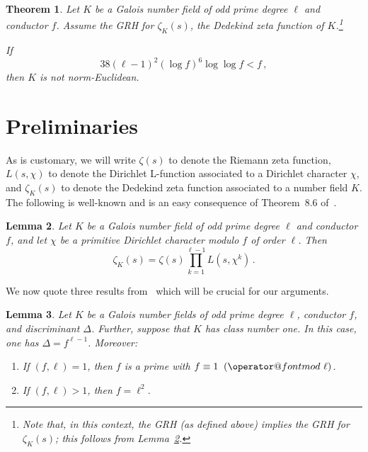 \documentclass{amsart}
\newtheorem{theorem}{Theorem}[section]
\newtheorem{lemma}[theorem]{Lemma}
\numberwithin{equation}{section}
\numberwithin{table}{section}
\begin{document}
\begin{theorem}\label{T:GRH}
 Let $K$ be a Galois number field of odd prime degree $\ell$ and conductor $f$.
 Assume the GRH for $\zeta_K(s)$, the Dedekind zeta function of $K$.\footnote{Note that, in this context, the GRH (as defined above) implies the GRH for $\zeta_K(s)$;
this follows from Lemma~\ref{L:factor}.
}
 
If
$$
  38(\ell-1)^2(\log f)^6\log\log f<f
  \,,
$$
then $K$ is not norm-Euclidean.
\end{theorem}

\section{Preliminaries}

As is customary, we will write $\zeta(s)$ to denote the Riemann zeta function,
$L(s,\chi)$ to denote the Dirichlet L-function associated to a Dirichlet character $\chi$,
and $\zeta_K(s)$ to denote the
Dedekind zeta function associated to a number field $K$.
The following is well-known and is an easy consequence of Theorem~8.6 of~\cite{narkiewicz:book}.

\begin{lemma}\label{L:factor}
Let $K$ be a Galois number field of odd prime degree $\ell$ and conductor $f$,
and  let $\chi$ be a primitive Dirichlet character modulo $f$ of order $\ell$.
Then
$$
  \zeta_K(s)=\zeta(s)\prod_{k=1}^{\ell-1}L(s,\chi^k)
  \,.
$$
\end{lemma}

We now quote three results from~\cite{mcgown:euclidean}
which will be crucial for our arguments.

\begin{lemma}\label{L:disc}
Let $K$ be a Galois number fields of odd prime degree $\ell$, conductor $f$, and discriminant $\Delta$.
Further, suppose that $K$ has class number one.
In this case, one has
$\Delta=f^{\ell-1}$.  Moreover:
\begin{enumerate}
\item
If $(f,\ell)=1$, then $f$ is a prime with $f\equiv1{\allowbreak\mkern10mu({\operator@font mod}\,\,\ell)}$.
\item
If $(f,\ell)>1$, then $f=\ell^2$.
\end{enumerate}
\end{lemma}
\end{document}
